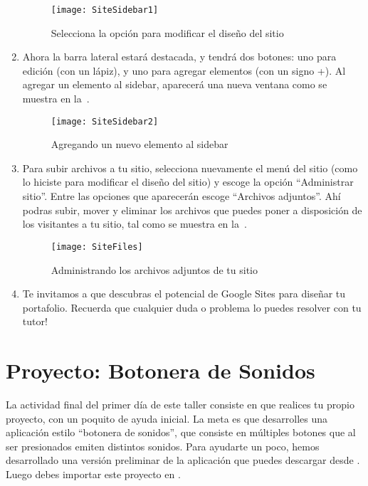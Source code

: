 \begin{enumerate}
\begin{figure}[H]
\centering
\texttt{[image: SiteSidebar1]}
\caption{Selecciona la opción para modificar el diseño del sitio}
\label{fig:SiteSidebar1}
\end{figure}

\item Ahora la barra lateral estará destacada, y tendrá dos botones:
  uno para edición (con un lápiz), y uno para agregar elementos (con
  un signo +). Al agregar un elemento al sidebar, aparecerá una nueva
  ventana como se muestra en la~.

\begin{figure}[H]
\centering
\texttt{[image: SiteSidebar2]}
\caption{Agregando un nuevo elemento al sidebar}
\label{fig:SiteSidebar2}
\end{figure}

\item Para subir archivos a tu sitio, selecciona nuevamente el menú
  del sitio (como lo hiciste para modificar el diseño del sitio) y
  escoge la opción ``Administrar sitio''. Entre las opciones que
  aparecerán escoge ``Archivos adjuntos''. Ahí podras subir, mover y
  eliminar los archivos que puedes poner a disposición de los
  visitantes a tu sitio, tal como se muestra en
  la~.

\begin{figure}[H]
\centering
\texttt{[image: SiteFiles]}
\caption{Administrando los archivos adjuntos de tu sitio}
\label{fig:SiteFiles}
\end{figure}



\item Te invitamos a que descubras el potencial de Google Sites para
  diseñar tu portafolio. Recuerda que cualquier duda o problema lo
  puedes resolver con tu tutor!

\end{enumerate}

\section{Proyecto: Botonera de Sonidos}
\label{sec:proy-boton-de}

La actividad final del primer día de este taller consiste en que
realices tu propio proyecto, con un poquito de ayuda inicial. La meta
es que desarrolles una aplicación estilo ``botonera de sonidos'', que
consiste en múltiples botones que al ser presionados emiten distintos
sonidos. Para ayudarte un poco, hemos desarrollado una versión
preliminar de la aplicación que puedes descargar desde
. Luego
debes importar este proyecto en \AppInventor.

